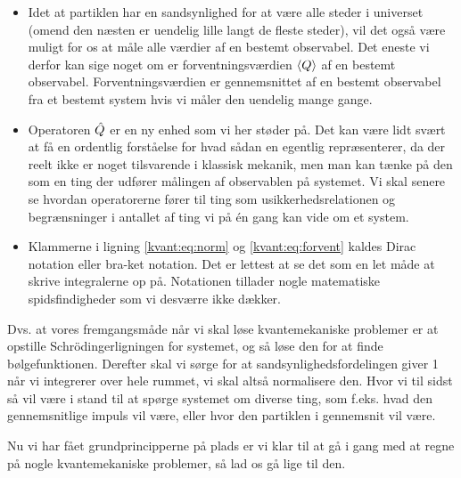 \documentclass[../Kvantemekanik.tex]{subfiles}
\begin{document}
\begin{itemize}
\item Idet at partiklen har en sandsynlighed for at være alle steder i universet (omend den næsten er uendelig lille langt de fleste steder), vil det også være muligt for os at måle alle værdier af en bestemt observabel. Det eneste vi derfor kan sige noget om er forventningsværdien $\left< Q \right>$ af en bestemt observabel. Forventningsværdien er gennemsnittet af en bestemt observabel fra et bestemt system hvis vi måler den uendelig mange gange.

\item Operatoren $\hat Q$ er en ny enhed som vi her støder på. Det kan være lidt svært at få en ordentlig forståelse for hvad sådan en egentlig repræsenterer, da der reelt ikke er noget tilsvarende i klassisk mekanik, men man kan tænke på den som en ting der udfører målingen af observablen på systemet. Vi skal senere se hvordan operatorerne fører til ting som usikkerhedsrelationen og begrænsninger i antallet af ting vi på én gang kan vide om et system.

\item Klammerne i ligning \eqref{kvant:eq:norm} og \eqref{kvant:eq:forvent} kaldes Dirac notation eller bra-ket notation. Det er lettest at se det som en let måde at skrive integralerne op på. Notationen tillader nogle matematiske spidsfindigheder som vi desværre ikke dækker.

\end{itemize}
Dvs. at vores fremgangsmåde når vi skal løse kvantemekaniske problemer er at opstille Schrödingerligningen for systemet, og så løse den for at finde bølgefunktionen. Derefter skal vi sørge for at sandsynlighedsfordelingen giver 1 når vi integrerer over hele rummet, vi skal altså normalisere den. Hvor vi til sidst så vil være i stand til at spørge systemet om diverse ting, som f.eks. hvad den gennemsnitlige impuls vil være, eller hvor den partiklen i gennemsnit vil være.

Nu vi har fået grundprincipperne på plads er vi klar til at gå i gang med at regne på nogle kvantemekaniske problemer, så lad os gå lige til den.
\end{document}
